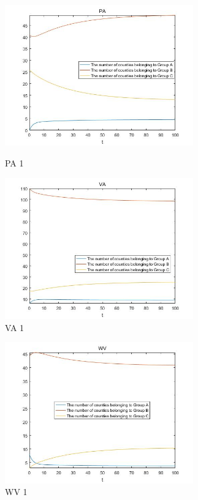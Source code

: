 \documentclass{mcmthesis}
\begin{document}
\begin{figure}[H]
\centering
\begin{minipage}[t]{0.45\textwidth}
\centering
\includegraphics[width=3.2in]{figures/picture/PA_1.jpg}
\caption{PA 1}
\label{PA 1}
\end{minipage}
\hfill
\begin{minipage}[t]{0.45\textwidth}
\centering
\includegraphics[width=3.2in]{figures/picture/VA_1.jpg}
\caption{VA 1}
\label{VA 1}
\end{minipage}
\end{figure}

\begin{figure}[H]
\centering
\begin{minipage}[t]{0.45\textwidth}
\centering
\includegraphics[width=3.2in]{figures/picture/WV_1.jpg}
\caption{WV 1}
\label{WV 1}
\end{minipage}
\hfill
\begin{minipage}[t]{0.45\textwidth}
\end{minipage}
\end{figure}
\end{document}
